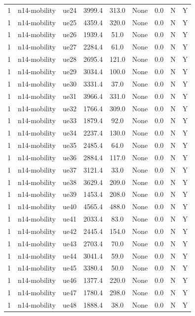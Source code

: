 \begin{table}[ht]
\begin{tabular}{|c|c|c|c|c|c|c|c|c|}
1 & n14-mobility & ue24 & 3999.4 & 313.0 & None & 0.0 & N & Y \\
1 & n14-mobility & ue25 & 4359.4 & 320.0 & None & 0.0 & N & Y \\
1 & n14-mobility & ue26 & 1939.4 & 51.0 & None & 0.0 & N & Y \\
1 & n14-mobility & ue27 & 2284.4 & 61.0 & None & 0.0 & N & Y \\
1 & n14-mobility & ue28 & 2695.4 & 121.0 & None & 0.0 & N & Y \\
1 & n14-mobility & ue29 & 3034.4 & 100.0 & None & 0.0 & N & Y \\
1 & n14-mobility & ue30 & 3331.4 & 37.0 & None & 0.0 & N & Y \\
1 & n14-mobility & ue31 & 3966.4 & 331.0 & None & 0.0 & N & Y \\
1 & n14-mobility & ue32 & 1766.4 & 309.0 & None & 0.0 & N & Y \\
1 & n14-mobility & ue33 & 1879.4 & 92.0 & None & 0.0 & N & Y \\
1 & n14-mobility & ue34 & 2237.4 & 130.0 & None & 0.0 & N & Y \\
1 & n14-mobility & ue35 & 2485.4 & 64.0 & None & 0.0 & N & Y \\
1 & n14-mobility & ue36 & 2884.4 & 117.0 & None & 0.0 & N & Y \\
1 & n14-mobility & ue37 & 3121.4 & 33.0 & None & 0.0 & N & Y \\
1 & n14-mobility & ue38 & 3629.4 & 209.0 & None & 0.0 & N & Y \\
1 & n14-mobility & ue39 & 1453.4 & 208.0 & None & 0.0 & N & Y \\
1 & n14-mobility & ue40 & 4565.4 & 488.0 & None & 0.0 & N & Y \\
1 & n14-mobility & ue41 & 2033.4 & 83.0 & None & 0.0 & N & Y \\
1 & n14-mobility & ue42 & 2445.4 & 154.0 & None & 0.0 & N & Y \\
1 & n14-mobility & ue43 & 2703.4 & 70.0 & None & 0.0 & N & Y \\
1 & n14-mobility & ue44 & 3041.4 & 59.0 & None & 0.0 & N & Y \\
1 & n14-mobility & ue45 & 3380.4 & 50.0 & None & 0.0 & N & Y \\
1 & n14-mobility & ue46 & 1377.4 & 220.0 & None & 0.0 & N & Y \\
1 & n14-mobility & ue47 & 1780.4 & 298.0 & None & 0.0 & N & Y \\
1 & n14-mobility & ue48 & 1888.4 & 38.0 & None & 0.0 & N & Y \\

\end{tabular}
\end{table}
